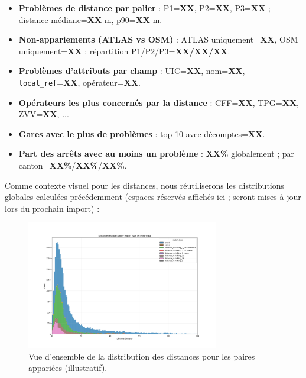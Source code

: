 \begin{itemize}
  \item \textbf{Problèmes de distance par palier} : P1=\textbf{XX}, P2=\textbf{XX}, P3=\textbf{XX} ; distance médiane=\textbf{XX} m, p90=\textbf{XX} m.
  \item \textbf{Non-appariements (ATLAS vs OSM)} : ATLAS uniquement=\textbf{XX}, OSM uniquement=\textbf{XX} ; répartition P1/P2/P3=\textbf{XX/XX/XX}.
  \item \textbf{Problèmes d'attributs par champ} : UIC=\textbf{XX}, nom=\textbf{XX}, \texttt{local\_ref}=\textbf{XX}, opérateur=\textbf{XX}.
  \item \textbf{Opérateurs les plus concernés par la distance} : CFF=\textbf{XX}, TPG=\textbf{XX}, ZVV=\textbf{XX}, ...
  \item \textbf{Gares avec le plus de problèmes} : top-10 avec décomptes=\textbf{XX}.
  \item \textbf{Part des arrêts avec au moins un problème} : \textbf{XX\%} globalement ; par canton=\textbf{XX\%}/\textbf{XX\%}/\textbf{XX\%}.
\end{itemize}

\noindent Comme contexte visuel pour les distances, nous réutiliserons les distributions globales calculées précédemment (espaces réservés affichés ici ; seront mises à jour lors du prochain import) :

\begin{figure}[h]
  \centering
  \includegraphics[width=0.75\textwidth]{../figures/plots/distance_distribution_all.png}
  \caption{Vue d'ensemble de la distribution des distances pour les paires appariées (illustratif).}
\end{figure}

